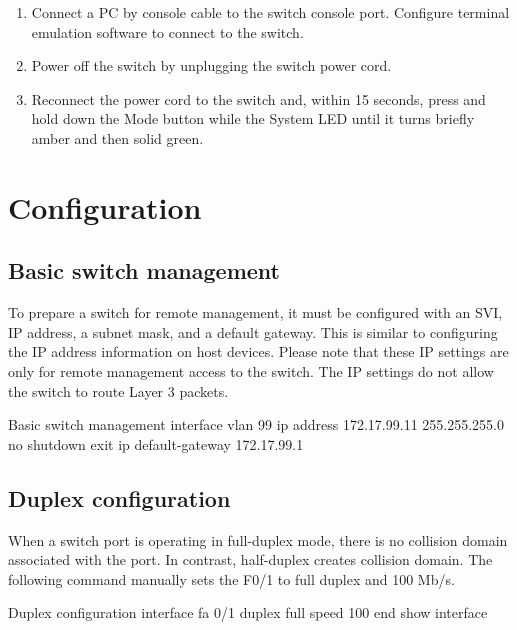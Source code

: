 \begin{enumerate}
\item Connect a PC by console cable to the switch console port. Configure terminal emulation software to connect to the switch.

\item Power off the switch by unplugging the switch power cord.

\item Reconnect the power cord to the switch and, within 15 seconds, press and hold down the Mode button while the System LED until it turns briefly amber and then solid green.
\end{enumerate}

\section{Configuration}

\subsection{Basic switch management}

To prepare a switch for remote management, it must be configured with an SVI, IP address, a subnet mask, and a default gateway. This is similar to configuring the IP address information on host devices. Please note that these IP settings are only for remote management access to the switch. The IP settings do not allow the switch to route Layer 3 packets.

\begin{sexylisting}{Basic switch management}
interface vlan 99
  ip address 172.17.99.11 255.255.255.0
  no shutdown
  exit
ip default-gateway 172.17.99.1
\end{sexylisting}

\subsection{Duplex configuration}

When a switch port is operating in full-duplex mode, there is no collision domain associated with the port. In contrast, half-duplex creates collision domain. The following command manually sets the F0/1 to full duplex and 100 Mb/s.

\begin{sexylisting}{Duplex configuration}
interface fa 0/1
  duplex full
  speed 100
  end
show interface
\end{sexylisting}

